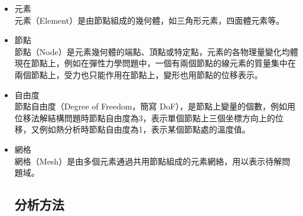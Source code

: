 \begin{itemize}
\qquad 有限元素法解決左側問題的方法，涉及電磁屏蔽。 磁性圓筒形遮蔽罩保護內部區域不受外部磁場影響。 如圖\ref{2.85}所示，顏色表示磁場的強度，紅色為高強度磁場。 圓柱體內部的區域是低強度的（深藍色，具有寬間隔的磁通量線），這表明遮蔽罩的性能達到了設計目標。\\
\begin{figure}[hbt!]
\begin{center}
\texttt{[image: 有限元素mash2]}
\caption{\Large 有限元素網格2}\label{2.85}
\end{center}
\end{figure}
\\
\subsection{有限元概念}

\item 元素\\
\qquad 元素（Element）是由節點組成的幾何體，如三角形元素，四面體元素等。 \\
\item 節點\\
\qquad 節點（Node）是元素幾何體的端點、頂點或特定點，元素的各物理量變化均體現在節點上，例如在彈性力學問題中，一個有兩個節點的線元素的質量集中在兩個節點上，受力也只能作用在節點上，變形也用節點的位移表示。 \\
\item 自由度\\
\qquad 節點自由度（Degree of Freedom，簡寫 DoF），是節點上變量的個數，例如用位移法解結構問題時節點自由度為3，表示單個節點上三個坐標方向上的位移，又例如熱分析時節點自由度為1，表示某個節點處的溫度值。 \\
\item 網格\\
\qquad 網格（Mesh）是由多個元素通過共用節點組成的元素網絡，用以表示待解問題域。 \\

\subsection{分析方法}


\end{itemize}
